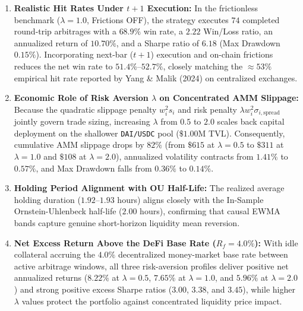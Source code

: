 \documentclass[11pt,a4paper]{article}
\begin{document}
\begin{enumerate}[noitemsep,topsep=2pt,leftmargin=1.5em]
\item \textbf{Realistic Hit Rates Under $t+1$ Execution:} In the frictionless benchmark ($\lambda=1.0$, Frictions OFF), the strategy executes $74$ completed round-trip arbitrages with a $68.9\%$ win rate, a $2.22$ Win/Loss ratio, an annualized return of $10.70\%$, and a Sharpe ratio of $6.18$ (Max Drawdown $0.15\%$). Incorporating next-bar ($t+1$) execution and on-chain frictions reduces the net win rate to $51.4\%$--$52.7\%$, closely matching the $\approx 53\%$ empirical hit rate reported by Yang \& Malik (2024) on centralized exchanges.
\item \textbf{Economic Role of Risk Aversion $\lambda$ on Concentrated AMM Slippage:} Because the quadratic slippage penalty $w_i^2 s_i$ and risk penalty $\lambda w_i^2 \sigma_{i,\text{spread}}$ jointly govern trade sizing, increasing $\lambda$ from $0.5$ to $2.0$ scales back capital deployment on the shallower \texttt{DAI/USDC} pool ($\$1.00\text{M}$ TVL). Consequently, cumulative AMM slippage drops by $82\%$ (from $\$615$ at $\lambda=0.5$ to $\$311$ at $\lambda=1.0$ and $\$108$ at $\lambda=2.0$), annualized volatility contracts from $1.41\%$ to $0.57\%$, and Max Drawdown falls from $0.36\%$ to $0.14\%$.
\item \textbf{Holding Period Alignment with OU Half-Life:} The realized average holding duration ($1.92$--$1.93$ hours) aligns closely with the In-Sample Ornstein-Uhlenbeck half-life ($2.00$ hours), confirming that causal EWMA bands capture genuine short-horizon liquidity mean reversion.
\item \textbf{Net Excess Return Above the DeFi Base Rate ($R_f = 4.0\%$):} With idle collateral accruing the $4.0\%$ decentralized money-market base rate between active arbitrage windows, all three risk-aversion profiles deliver positive net annualized returns ($8.22\%$ at $\lambda=0.5$, $7.65\%$ at $\lambda=1.0$, and $5.96\%$ at $\lambda=2.0$) and strong positive excess Sharpe ratios ($3.00$, $3.38$, and $3.45$), while higher $\lambda$ values protect the portfolio against concentrated liquidity price impact.
\end{enumerate}
\end{document}
